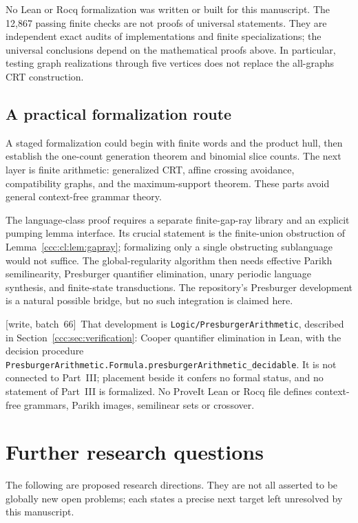 \documentclass[11pt,letterpaper]{article}
\theoremstyle{definition}
\theoremstyle{remark}
\newcommand{\wsix}{\textup{[write, batch~66]}}
\begin{document}
No Lean or Rocq formalization was written or built for this manuscript.
The 12,867 passing finite checks are not proofs of universal statements.
They are independent exact audits of implementations and finite
specializations; the universal conclusions depend on the mathematical
proofs above. In particular, testing graph realizations through five
vertices does not replace the all-graphs CRT construction.

\subsection{A practical formalization route}

A staged formalization could begin with finite words and the product hull,
then establish the one-count generation theorem and binomial slice counts.
The next layer is finite arithmetic: generalized CRT, affine crossing
avoidance, compatibility graphs, and the maximum-support theorem.
These parts avoid general context-free grammar theory.

The language-class proof requires a separate finite-gap-ray library and
an explicit pumping lemma interface. Its crucial statement is the
finite-union obstruction of Lemma~\ref{ccc:cl:lem:gapray}; formalizing only a
single obstructing sublanguage would not suffice. The global-regularity
algorithm then needs effective Parikh semilinearity, Presburger
quantifier elimination, unary periodic language synthesis, and
finite-state transductions. The repository's Presburger development is a
natural possible bridge, but no such integration is claimed here.

\wsix\ That development is \texttt{Logic/PresburgerArithmetic}, described in
Section~\ref{ccc:sec:verification}: Cooper quantifier elimination in Lean,
with the decision procedure
\nolinkurl{PresburgerArithmetic.Formula.presburgerArithmetic_decidable}. It is
not connected to Part~III; placement beside it confers no formal status, and
no statement of Part~III is formalized. No ProveIt Lean or Rocq file defines
context-free grammars, Parikh images, semilinear sets or crossover.

\section{Further research questions}\label{ccc:cl:sec:questions}

The following are proposed research directions. They are not all asserted
to be globally new open problems; each states a precise next target left
unresolved by this manuscript.
\end{document}
